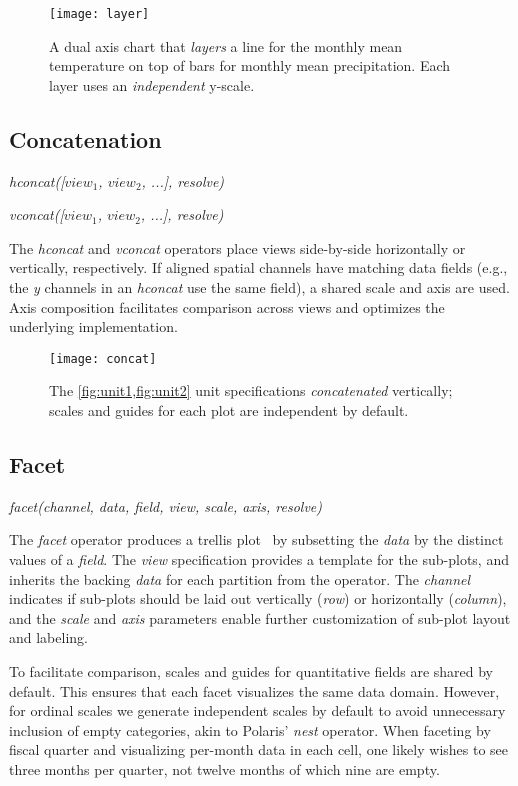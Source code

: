 \begin{figure*}[h!]
  \centering
  \texttt{[image: layer]}
  \caption{A dual axis chart that \emph{layers} a line for the monthly mean
  temperature on top of bars for monthly mean precipitation. Each layer uses an
  \emph{independent} y-scale.}
  \label{fig:layer}
\end{figure*}

\subsection{Concatenation}

\centerline{
  \emph{hconcat([$view_1$, $view_2$, ...], resolve)}
}
\centerline{
  \emph{vconcat([$view_1$, $view_2$, ...], resolve)}
}

The \emph{hconcat} and \emph{vconcat} operators place views side-by-side
horizontally or vertically, respectively. If aligned spatial channels have
matching data fields (e.g., the \emph{y} channels in an \emph{hconcat} use the
same field), a shared scale and axis are used. Axis composition facilitates
comparison across views and optimizes the underlying implementation.

\begin{figure*}[h!]
  \centering
  \texttt{[image: concat]}
  \caption{The \cref{fig:unit1,fig:unit2} unit specifications
  \emph{concatenated} vertically; scales and guides for each
  plot are independent by default.}
  \label{fig:concat}
\end{figure*}

\subsection{Facet}

\centerline{
  \emph{facet(channel, data, field, view, scale, axis, resolve)}
}


The \emph{facet} operator produces a trellis plot~\cite{becker:trellis} by
subsetting the \emph{data} by the distinct values of a \emph{field}. The
\emph{view} specification provides a template for the sub-plots, and inherits
the backing \emph{data} for each partition from the operator. The \emph{channel}
indicates if sub-plots should be laid out vertically (\emph{row}) or
horizontally (\emph{column}), and the \emph{scale} and \emph{axis} parameters
enable further customization of sub-plot layout and labeling.

To facilitate comparison, scales and guides for quantitative fields are shared
by default. This ensures that each facet visualizes the same data domain.
However, for ordinal scales we generate independent scales by default to avoid
unnecessary inclusion of empty categories, akin to Polaris' \emph{nest}
operator. When faceting by fiscal quarter and visualizing per-month data in
each cell, one likely wishes to see three months per quarter, not twelve
months of which nine are empty.

